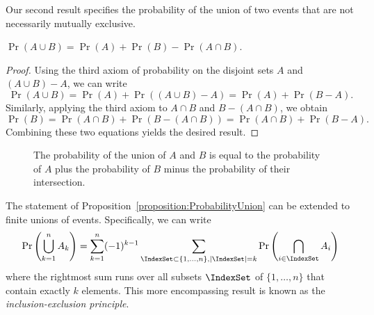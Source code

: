 Our second result specifies the probability of the union of two events that are not necessarily mutually exclusive.
\begin{proposition} \label{proposition:ProbabilityUnion}
$\Pr (A \cup B) = \Pr (A) + \Pr (B) - \Pr (A \cap B)$.
\end{proposition}
\begin{proof}
Using the third axiom of probability on the disjoint sets $A$ and $(A \cup B) - A$, we can write
\begin{equation*}
\Pr (A \cup B)
= \Pr (A) + \Pr ((A \cup B) - A)
= \Pr (A) + \Pr (B - A) .
\end{equation*}
Similarly, applying the third axiom to $A \cap B$ and $B - (A \cap B)$, we obtain
\begin{equation*}
\Pr (B)
= \Pr (A \cap B) + \Pr (B - (A \cap B))
= \Pr (A \cap B) + \Pr (B - A) .
\end{equation*}
Combining these two equations yields the desired result.
\end{proof}
\begin{figure}[htb!]
\begin{center}
\caption{The probability of the union of $A$ and $B$ is equal to the probability of $A$ plus the probability of $B$ minus the probability of their intersection.}
\end{center}
\end{figure}

The statement of Proposition~\ref{proposition:ProbabilityUnion} can be extended to finite unions of events.
Specifically, we can write
\begin{equation*}
\Pr \left( \bigcup_{k=1}^{n} A_k \right)
= \sum_{k = 1}^{n} (-1)^{k-1} \sum_{\IndexSet \subset \{1, \ldots, n \}, |\IndexSet| =k } \Pr \left( \bigcap_{i \in \IndexSet} A_i \right)
\end{equation*}
where the rightmost sum runs over all subsets $\IndexSet$ of $\{ 1, \ldots, n \}$ that contain exactly $k$ elements.
This more encompassing result is known as the \emph{inclusion-exclusion principle}.

